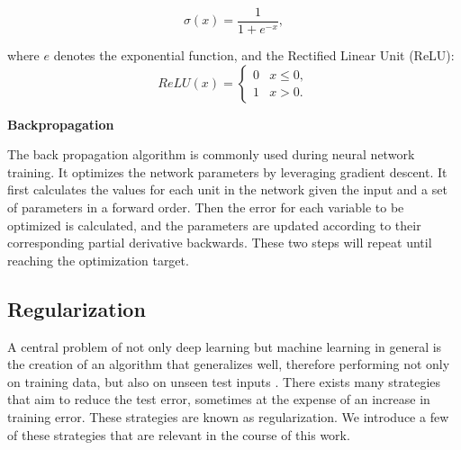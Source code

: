 \begin{equation}
    \sigma (x)= \frac{1}{1+e^{-x}},
\end{equation}

where $e$ denotes the exponential function, and the Rectified Linear Unit (ReLU):
\begin{equation}
    ReLU(x)=\begin{cases}
        0 & x \leq 0, \\
        1 & x > 0.
    \end{cases}
\end{equation}
\bigskip

\textbf{Backpropagation}\par
The back propagation algorithm is commonly used during neural network training. It optimizes the network parameters by leveraging gradient descent. It first calculates the values for each unit in the network given the input and a set of parameters in a forward order. Then the error for each variable to be optimized is calculated, and the parameters are updated according to their corresponding partial derivative backwards. These two steps will repeat until reaching the optimization target.

\subsection{Regularization}
A central problem of not only deep learning but machine learning in general is the creation of an algorithm that generalizes well, therefore performing not only on training data, but also on unseen test inputs \cite{Goodfellow-et-al-2016}. There exists many strategies that aim to reduce the test error, sometimes at the expense of an increase in training error. These strategies are known as regularization. We introduce a few of these strategies that are relevant in the course of this work.\bigskip

